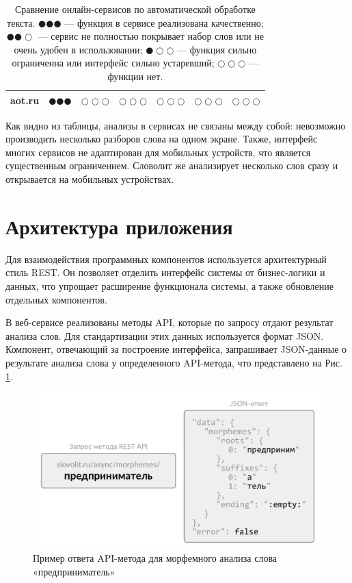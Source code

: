 \documentclass[a4paper,12pt]{article}
\begin{document}
\begin{table}[ht!]
{\begin{tabular}{| c | c | c | c | c | c | c |}
\hline
aot.ru & $\CIRCLE\CIRCLE\CIRCLE$ & $\Circle\Circle\Circle$ & $\Circle\Circle\Circle$ & $\Circle\Circle\Circle$ & $\Circle\Circle\Circle$ & $\Circle\Circle\Circle$ \\ 
\hline
\end{tabular}
}
\caption{Сравнение онлайн-сервисов по автоматической обработке текста. $\CIRCLE\CIRCLE\CIRCLE$ — функция в сервисе реализована качественно; $\CIRCLE\CIRCLE\Circle$ — сервис не полностью покрывает набор слов или не очень удобен в использовании; $\CIRCLE\Circle\Circle$ — функция сильно ограниченна или интерфейс сильно устаревший; $\Circle\Circle\Circle$ — функции нет.}
\label{table:1}
\end{table}

Как видно из таблицы, анализы в сервисах не связаны между собой: невозможно производить несколько разборов слова на одном экране. Также, интерфейс многих сервисов не адаптирован для мобильных устройств, что является существенным ограничением. Словолит же анализирует несколько слов сразу и открывается на мобильных устройствах.

\section{Архитектура приложения}
Для взаимодействия программных компонентов используется архитектурный стиль REST. Он позволяет отделить интерфейс системы от бизнес-логики и данных, что упрощает расширение функционала системы, а также обновление отдельных компонентов.

В веб-сервисе реализованы методы API, которые по запросу отдают результат анализа слов. Для стандартизации этих данных используется формат JSON. Компонент, отвечающий за построение интерфейса, запрашивает JSON-данные о результате анализа слова у определенного API-метода, что представлено на Рис. \ref{fig:api_method_example}.

\begin{figure}[ht!]
\centering
\includegraphics[scale=0.3]{api_method_example}
\caption{Пример ответа API-метода для морфемного анализа слова «предприниматель»}
\label{fig:api_method_example}
\end{figure}
\end{document}
